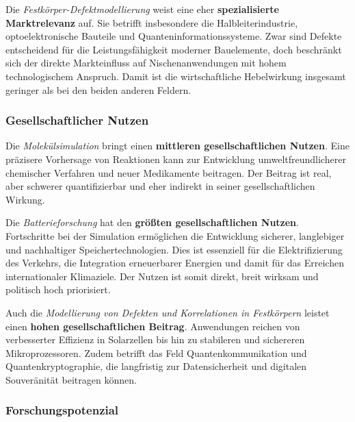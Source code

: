 \vspace{0.5em}

Die \textit{Festkörper-Defektmodellierung} weist eine eher \textbf{spezialisierte Marktrelevanz} auf. Sie betrifft insbesondere die Halbleiterindustrie, optoelektronische Bauteile und Quanteninformationssysteme. \cite{bassett_quantum_2019} Zwar sind Defekte entscheidend für die Leistungsfähigkeit moderner Bauelemente, doch beschränkt sich der direkte Markteinfluss auf Nischenanwendungen mit hohem technologischem Anspruch. Damit ist die wirtschaftliche Hebelwirkung insgesamt geringer als bei den beiden anderen Feldern.



\subsubsection{Gesellschaftlicher Nutzen}

Die \textit{Molekülsimulation} bringt einen \textbf{mittleren gesellschaftlichen Nutzen}. Eine präzisere Vorhersage von Reaktionen kann zur Entwicklung umweltfreundlicherer chemischer Verfahren und neuer Medikamente beitragen. Der Beitrag ist real, aber schwerer quantifizierbar und eher indirekt in seiner gesellschaftlichen Wirkung. \cite{mcardle_quantum_2020}

\vspace{0.5em}

Die \textit{Batterieforschung} hat den \textbf{größten gesellschaftlichen Nutzen}. Fortschritte bei der Simulation ermöglichen die Entwicklung sicherer, langlebiger und nachhaltiger Speichertechnologien. Dies ist essenziell für die Elektrifizierung des Verkehrs, die Integration erneuerbarer Energien und damit für das Erreichen internationaler Klimaziele. \cite{demirApplicationQuantumComputing2024} Der Nutzen ist somit direkt, breit wirksam und politisch hoch priorisiert.

\vspace{0.5em}

Auch die \textit{Modellierung von Defekten und Korrelationen in Festkörpern} leistet einen \textbf{hohen gesellschaftlichen Beitrag}. Anwendungen reichen von verbesserter Effizienz in Solarzellen bis hin zu stabileren und sichereren Mikroprozessoren. Zudem betrifft das Feld Quantenkommunikation und Quantenkryptographie, die langfristig zur Datensicherheit und digitalen Souveränität beitragen können. \cite{cao_ab_2023,bassett_quantum_2019}


\subsubsection{Forschungspotenzial}

